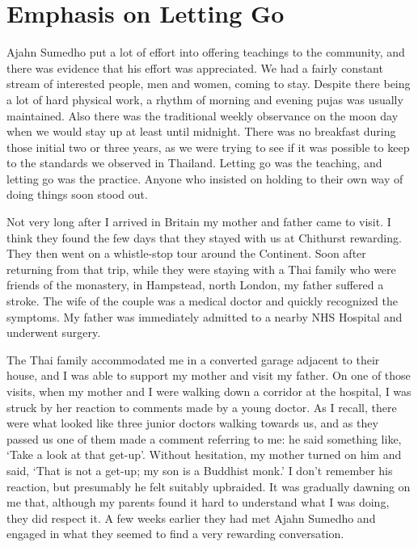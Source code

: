 \chapter{Emphasis on Letting Go}

Ajahn Sumedho put a lot of effort into offering teachings to the
community, and there was evidence that his effort was appreciated. We
had a fairly constant stream of interested people, men and women, coming
to stay. Despite there being a lot of hard physical work, a rhythm of
morning and evening pujas was usually maintained. Also there was the
traditional weekly observance on the moon day when we would stay up at
least until midnight. There was no breakfast during those initial two or
three years, as we were trying to see if it was possible to keep to the
standards we observed in Thailand. Letting go was the teaching, and
letting go was the practice. Anyone who insisted on holding to their own
way of doing things soon stood out.

Not very long after I arrived in Britain my mother and father came to
visit. I think they found the few days that they stayed with us at
Chithurst rewarding. They then went on a whistle-stop tour around the
Continent. Soon after returning from that trip, while they were staying
with a Thai family who were friends of the monastery, in Hampstead,
north London, my father suffered a stroke. The wife of the couple was a
medical doctor and quickly recognized the symptoms. My father was
immediately admitted to a nearby NHS Hospital and underwent surgery.

The Thai family accommodated me in a converted garage adjacent to their
house, and I was able to support my mother and visit my father. On one
of those visits, when my mother and I were walking down a corridor at
the hospital, I was struck by her reaction to comments made by a young
doctor. As I recall, there were what looked like three junior doctors
walking towards us, and as they passed us one of them made a comment
referring to me: he said something like, `Take a look at that get-up'.
Without hesitation, my mother turned on him and said, `That is not a
get-up; my son is a Buddhist monk.' I don't remember his reaction, but
presumably he felt suitably upbraided. It was gradually dawning on me
that, although my parents found it hard to understand what I was doing,
they did respect it. A few weeks earlier they had met Ajahn Sumedho and
engaged in what they seemed to find a very rewarding conversation.

